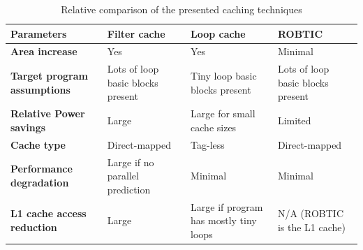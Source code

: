 \documentclass[conference]{IEEEtran}
\begin{document}
	\begin{table}[t]
	\centering
		\caption{Relative comparison of the presented caching techniques}
		\begin{tabular}{ | p{1.7cm} | p{1.7cm} |p{1.7cm} | p{1.7cm} |}
			\hline
			Parameters	& \textbf{Filter cache} &  	\textbf{Loop cache} &	\textbf{ROBTIC}\\ \hline
			\textbf{Area increase} &	Yes &	Yes	& Minimal \\ \hline
			\textbf{Target program assumptions} & Lots of loop basic blocks present	& Tiny loop basic blocks present	&	Lots of loop basic blocks present\\ \hline
			\textbf{Relative Power savings} & Large & Large for small cache sizes & Limited \\ \hline
			\textbf{Cache type} & Direct-mapped	& Tag-less	&	Direct-mapped \\ \hline
			\textbf{Performance degradation}	& Large if no parallel prediction	& Minimal & Minimal\\ \hline
			\textbf{L1 cache access reduction}	& Large	& Large if program has mostly tiny loops	&N/A (ROBTIC is the L1 cache)\\ \hline
		\end{tabular}
		\label{table:caching_comp}
	\end{table}

\end{document}
